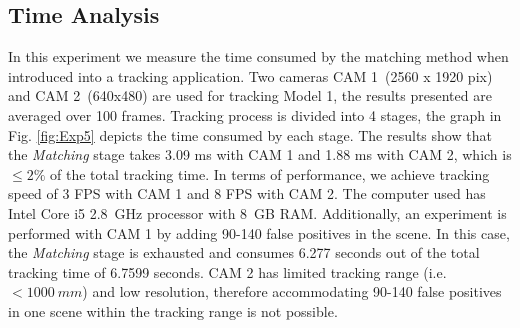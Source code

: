 \documentclass{bmvc2k}
\begin{document}
\subsection{Time Analysis}
In this experiment we measure the time consumed by the matching method when introduced into a tracking application. 
Two cameras CAM 1~(2560 x 1920 pix) and CAM 2~(640x480) are used for tracking Model 1, the results presented are averaged over 100 frames. 
Tracking process is divided into 4 stages, the graph in Fig. \ref{fig:Exp5} depicts the time consumed by each stage.
The results show that the \textit{Matching} stage takes 3.09 ms with CAM 1 and 1.88 ms with CAM 2, which is $ \le 2\% $ of the total tracking time. 
In terms of performance, we achieve tracking speed of 3 FPS with CAM 1 and 8 FPS with CAM 2. 
The computer used has Intel Core i5 2.8~GHz processor with 8~GB RAM. 
Additionally, an experiment is performed with CAM 1 by adding 90-140 false positives in the scene. 
In this case, the \textit{Matching} stage is exhausted and consumes 6.277 seconds out of the total tracking time of 6.7599 seconds. 
CAM 2 has limited tracking range (i.e. $ < 1000~mm $) and low resolution, therefore accommodating 90-140 false positives in one scene within the tracking range is not possible. 
\end{document}
